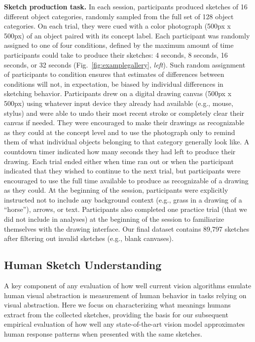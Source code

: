 \documentclass{article}
\newcommand{\edited}[1]{\textcolor{Blue}{#1}}
\begin{document}
\textbf{Sketch production task.} In each session, participants produced sketches of 16 different object categories, randomly sampled from the full set of 128 object categories.
On each trial, they were cued with a color photograph (500px x 500px) of an object paired with its concept label. 
Each participant was randomly assigned to one of four conditions, defined by the maximum amount of time participants could take to produce their sketches: 4 seconds, 8 seconds, 16 seconds, or 32 seconds (Fig.~\ref{fig:examplegallery}, \textit{left}). 
Such random assignment of participants to condition ensures that estimates of differences between conditions will not, in expectation, be biased by individual differences in sketching behavior.
Participants drew on a digital drawing canvas (500px x 500px) using whatever input device they already had available (e.g., mouse, stylus) and were able to undo their most recent stroke or completely clear their canvas if needed. 
They were encouraged to make their drawings as recognizable as they could at the concept level and to use the photograph only to remind them of what individual objects belonging to that category generally look like.  
A countdown timer indicated how many seconds they had left to produce their drawing. 
Each trial ended either when time ran out or when the participant indicated that they wished to continue to the next trial, but participants were encouraged to use the full time available to produce as recognizable of a drawing as they could.
At the beginning of the session, participants were explicitly instructed not to include any background context (e.g., grass in a drawing of a ``horse''), arrows, or text.
Participants also completed one practice trial (that we did not include in analyses) at the beginning of the session to familiarize themselves with the drawing interface.
Our final dataset contains 89,797 sketches after filtering out invalid sketches (e.g., blank canvases).



\subsection{Human Sketch Understanding}
\vspace{-1em}
A key component of any evaluation of how well current vision algorithms emulate human visual abstraction is measurement of human behavior in tasks relying on visual abstraction. 
Here we focus on characterizing what meanings humans extract from the collected sketches, providing the basis for our subsequent empirical evaluation of how well any state-of-the-art vision model approximates human response patterns when presented with the same sketches.  
\end{document}
